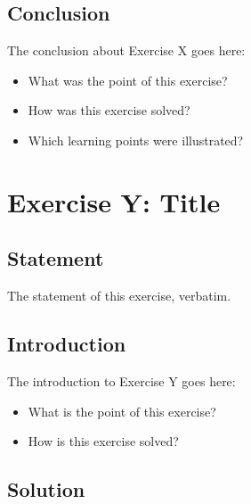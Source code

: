 \documentclass[12pt]{article}
\begin{document}

\subsection{Conclusion}

The conclusion about Exercise X goes here:

\begin{itemize}

\item
  What was the point of this exercise?

\item
  How was this exercise solved?

\item
  Which learning points were illustrated?

\end{itemize}


\newpage

\section{Exercise Y: Title}


\subsection{Statement}

The statement of this exercise, verbatim.


\subsection{Introduction}

The introduction to Exercise Y goes here:

\begin{itemize}

\item
  What is the point of this exercise?

\item
  How is this exercise solved?

\end{itemize}


\subsection{Solution}
\end{document}
